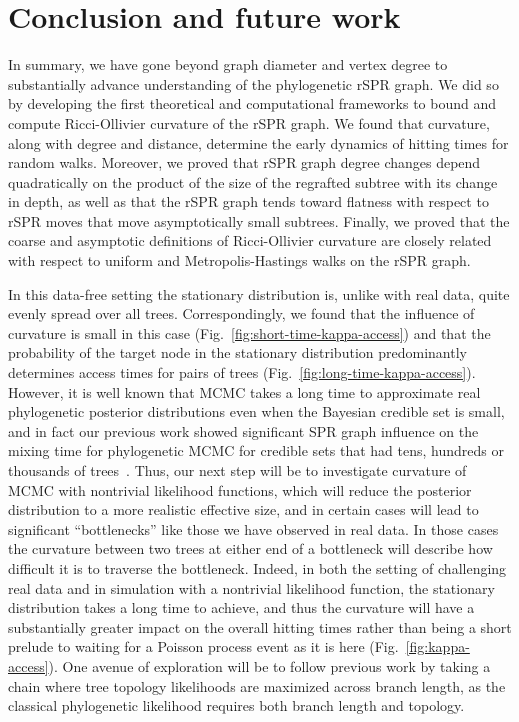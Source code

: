 \documentclass[]{elsarticle}
\begin{document}
\section{Conclusion and future work}
In summary, we have gone beyond graph diameter and vertex degree to substantially advance understanding of the phylogenetic rSPR graph.
We did so by developing the first theoretical and computational frameworks to bound and compute Ricci-Ollivier curvature of the rSPR graph.
We found that curvature, along with degree and distance, determine the early dynamics of hitting times for random walks.
Moreover, we proved that rSPR graph degree changes depend quadratically on the product of the size of the regrafted subtree with its change in depth, as well as that the rSPR graph tends toward flatness with respect to rSPR moves that move asymptotically small subtrees.
Finally, we proved that the coarse and asymptotic definitions of Ricci-Ollivier curvature are closely related with respect to uniform and Metropolis-Hastings walks on the rSPR graph.


In this data-free setting the stationary distribution is, unlike with real data, quite evenly spread over all trees.
Correspondingly, we found that the influence of curvature is small in this case (Fig.~\ref{fig:short-time-kappa-access}) and that the probability of the target node in the stationary distribution predominantly determines access times for pairs of trees (Fig.~\ref{fig:long-time-kappa-access}).
However, it is well known that MCMC takes a long time to approximate real phylogenetic posterior distributions even when the Bayesian credible set is small, and in fact our previous work showed significant SPR graph influence on the mixing time for phylogenetic MCMC for credible sets that had tens, hundreds or thousands of trees~\citep{Whidden2015-yi}.
Thus, our next step will be to investigate curvature of MCMC with nontrivial likelihood functions, which will reduce the posterior distribution to a more realistic effective size, and in certain cases will lead to significant ``bottlenecks'' like those we have observed in real data.
In those cases the curvature between two trees at either end of a bottleneck will describe how difficult it is to traverse the bottleneck.
Indeed, in both the setting of challenging real data and in simulation with a nontrivial likelihood function, the stationary distribution takes a long time to achieve, and thus the curvature will have a substantially greater impact on the overall hitting times rather than being a short prelude to waiting for a Poisson process event as it is here (Fig.~\ref{fig:kappa-access}).
One avenue of exploration will be to follow previous work \citep{Stefankovic2011-hu} by taking a chain where tree topology likelihoods are maximized across branch length, as the classical phylogenetic likelihood \citep{felsenstein1981evolutionary} requires both branch length and topology.
\end{document}
